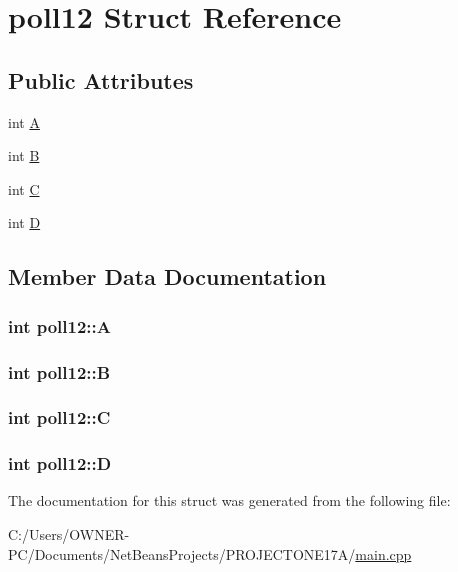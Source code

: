 \hypertarget{structpoll12}{\section{poll12 Struct Reference}
\label{structpoll12}
}
\subsection*{Public Attributes}
\begin{DoxyCompactItemize}
\item 
int \hyperlink{structpoll12_af00c0ecfa01022dd1f53562cec37323e}{A}
\item 
int \hyperlink{structpoll12_a9a0a953cd7e533fc2b83c4be2fa8c593}{B}
\item 
int \hyperlink{structpoll12_a6adf7ce16a7bada5acc6945deb4d3423}{C}
\item 
int \hyperlink{structpoll12_ada1464be14da286203f662beecf100da}{D}
\end{DoxyCompactItemize}


\subsection{Member Data Documentation}
\hypertarget{structpoll12_af00c0ecfa01022dd1f53562cec37323e}{
\subsubsection[{A}]{\setlength{\rightskip}{0pt plus 5cm}int poll12\+::\+A}}\label{structpoll12_af00c0ecfa01022dd1f53562cec37323e}
\hypertarget{structpoll12_a9a0a953cd7e533fc2b83c4be2fa8c593}{
\subsubsection[{B}]{\setlength{\rightskip}{0pt plus 5cm}int poll12\+::\+B}}\label{structpoll12_a9a0a953cd7e533fc2b83c4be2fa8c593}
\hypertarget{structpoll12_a6adf7ce16a7bada5acc6945deb4d3423}{
\subsubsection[{C}]{\setlength{\rightskip}{0pt plus 5cm}int poll12\+::\+C}}\label{structpoll12_a6adf7ce16a7bada5acc6945deb4d3423}
\hypertarget{structpoll12_ada1464be14da286203f662beecf100da}{
\subsubsection[{D}]{\setlength{\rightskip}{0pt plus 5cm}int poll12\+::\+D}}\label{structpoll12_ada1464be14da286203f662beecf100da}


The documentation for this struct was generated from the following file\+:\begin{DoxyCompactItemize}
\item 
C\+:/\+Users/\+O\+W\+N\+E\+R-\/\+P\+C/\+Documents/\+Net\+Beans\+Projects/\+P\+R\+O\+J\+E\+C\+T\+O\+N\+E17\+A/\hyperlink{main_8cpp}{main.\+cpp}\end{DoxyCompactItemize}

